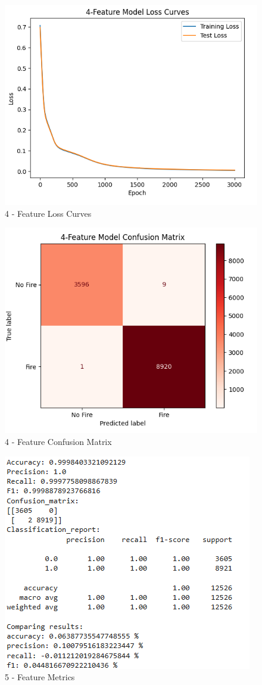 \documentclass[conference]{IEEEtran}
\begin{document}
\begin{figure}
    \centering
    \includegraphics[width=0.75\linewidth]{images/4LC.png}
    \caption{4 - Feature Loss Curves}
    \label{fig:3.1}
\end{figure}

\begin{figure}
    \centering
    \includegraphics[width=0.75\linewidth]{images/4CM.png}
    \caption{4 - Feature Confusion Matrix}
    \label{fig:3.2}
\end{figure}

\begin{figure}
    \centering
    \includegraphics[width=0.75\linewidth]{images/5metric.png}
    \caption{5 - Feature Metrics}
    \label{fig:4.0}
\end{figure}
\end{document}
